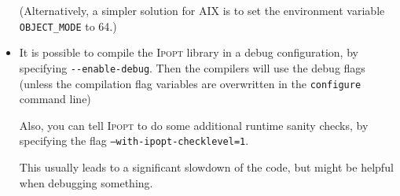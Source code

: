 \documentclass[10pt]{article}
\newcommand{\Ipopt}{\textsc{Ipopt}\xspace}
\begin{document}
\begin{itemize}
  (Alternatively, a simpler solution for AIX is to set the environment variable {\tt OBJECT\_MODE} to 64.)



\item It is possible to compile the \Ipopt library in a debug
  configuration, by specifying \verb|--enable-debug|.  Then the
  compilers will use the debug flags (unless the compilation flag
  variables are overwritten in the {\tt configure} command line)

  Also, you can tell \Ipopt to do some additional runtime sanity
  checks, by specifying the flag {\tt --with-ipopt-checklevel=1}.

  This usually leads to a significant slowdown of the code, but might
  be helpful when debugging something.

%

\end{itemize}
\end{document}
